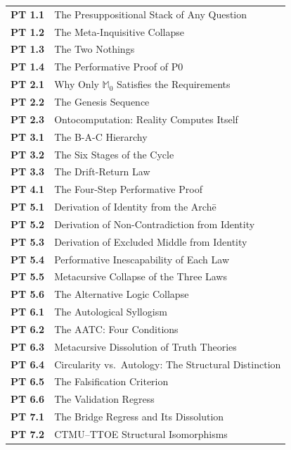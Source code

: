 \documentclass[10pt, openany, oneside]{book}
\renewcommand{\footnotesize}{\fontsize{8.5}{11}\selectfont}
\begin{document}
{\footnotesize
\noindent\begin{tabular}{r p{}}
\textbf{PT 1.1} & The Presuppositional Stack of Any Question \\[0.2em]
\textbf{PT 1.2} & The Meta-Inquisitive Collapse \\[0.2em]
\textbf{PT 1.3} & The Two Nothings \\[0.2em]
\textbf{PT 1.4} & The Performative Proof of P0 \\[0.2em]
\textbf{PT 2.1} & Why Only $\mathbb{M}_0$ Satisfies the Requirements \\[0.2em]
\textbf{PT 2.2} & The Genesis Sequence \\[0.2em]
\textbf{PT 2.3} & Ontocomputation: Reality Computes Itself \\[0.2em]
\textbf{PT 3.1} & The B-A-C Hierarchy \\[0.2em]
\textbf{PT 3.2} & The Six Stages of the Cycle \\[0.2em]
\textbf{PT 3.3} & The Drift-Return Law \\[0.2em]
\textbf{PT 4.1} & The Four-Step Performative Proof \\[0.2em]
\textbf{PT 5.1} & Derivation of Identity from the Arch\={e} \\[0.2em]
\textbf{PT 5.2} & Derivation of Non-Contradiction from Identity \\[0.2em]
\textbf{PT 5.3} & Derivation of Excluded Middle from Identity \\[0.2em]
\textbf{PT 5.4} & Performative Inescapability of Each Law \\[0.2em]
\textbf{PT 5.5} & Metacursive Collapse of the Three Laws \\[0.2em]
\textbf{PT 5.6} & The Alternative Logic Collapse \\[0.2em]
\textbf{PT 6.1} & The Autological Syllogism \\[0.2em]
\textbf{PT 6.2} & The AATC: Four Conditions \\[0.2em]
\textbf{PT 6.3} & Metacursive Dissolution of Truth Theories \\[0.2em]
\textbf{PT 6.4} & Circularity vs.\ Autology: The Structural Distinction \\[0.2em]
\textbf{PT 6.5} & The Falsification Criterion \\[0.2em]
\textbf{PT 6.6} & The Validation Regress \\[0.2em]
\textbf{PT 7.1} & The Bridge Regress and Its Dissolution \\[0.2em]
\textbf{PT 7.2} & CTMU--TTOE Structural Isomorphisms \\[0.2em]

\end{tabular}}
\end{document}
